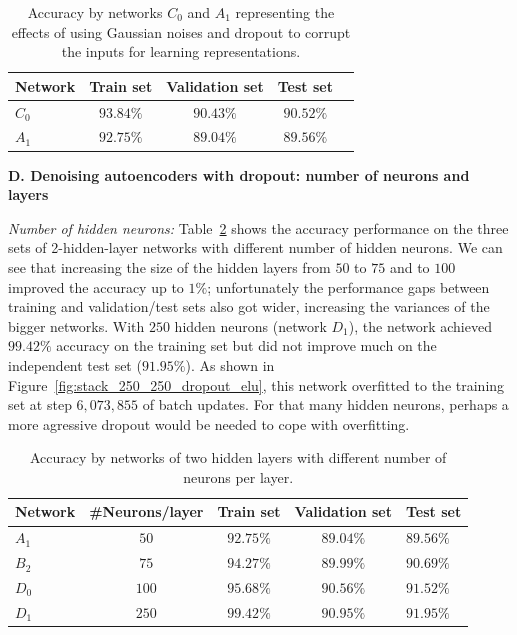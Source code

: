 \documentclass[12pt]{article}
\begin{document}
\begin{table}
\begin{center}
\begin{tabular}{|l||c|c|c|l|}
\hline
Network & Train set & Validation set & Test set\\ \hline \hline
$C_0$ & $93.84\%$ & $90.43\%$ & $90.52\%$\\ \hline
$A_1$ & $92.75\%$ & $89.04\%$ & $89.56\%$ \\ \hline
\end{tabular}
\caption{Accuracy by networks $C_0$ and $A_1$ representing the effects of using Gaussian noises and dropout to corrupt the inputs for learning representations.}
\label{tab:Accuracy_C0_vs_A1}
\end{center}
\end{table}

\vspace{5mm}
\noindent
\textbf{D. Denoising autoencoders with dropout: number of neurons and layers}

\textit{Number of hidden neurons:} Table~\ref{tab:Accuracy_diff_num_neurons} shows the accuracy performance on the three sets of 2-hidden-layer networks with different number of hidden neurons. We can see that increasing the size of the hidden layers from $50$ to $75$ and to $100$ improved the accuracy up to $1\%$; unfortunately the performance gaps between training and validation/test sets also got wider, increasing the variances of the bigger networks. With $250$ hidden neurons (network $D_1$), the network achieved $99.42\%$ accuracy on the training set but did not improve much on the independent test set ($91.95\%$). As shown in Figure~\ref{fig:stack_250_250_dropout_elu}, this network overfitted to the training set at step $6,073,855$ of batch updates. For that many hidden neurons, perhaps a more agressive dropout would be needed to cope with overfitting.

\begin{table}
\begin{center}
\begin{tabular}{|l||c|c|c|l|}
\hline
Network & \#Neurons/layer & Train set & Validation set & Test set\\ \hline \hline
$A_1$ & $50$ & $92.75\%$ & $89.04\%$ & $89.56\%$\\ \hline
$B_2$ & $75$ & $94.27\%$ & $89.99\%$ & $90.69\%$ \\ \hline
$D_0$ & $100$ & $95.68\%$ & $90.56\%$ & $91.52\%$ \\ \hline
$D_1$ & $250$ & $99.42\%$ & $90.95\%$ & $91.95\%$ \\ \hline
\end{tabular}
\caption{Accuracy by networks of two hidden layers with different number of neurons per layer.}
\label{tab:Accuracy_diff_num_neurons}
\end{center}
\end{table}
\end{document}
